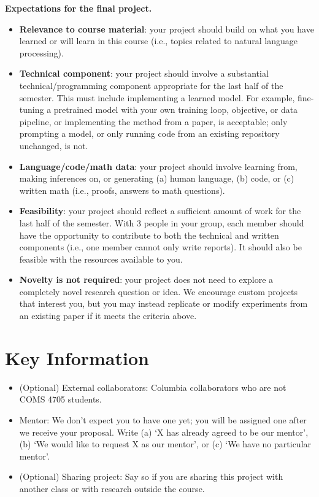 \documentclass{article}
\newcommand{\note}[1]{#1}
\begin{document}
\begin{instructions}
\textbf{Expectations for the final project.}
\begin{itemize}
    \item \textbf{Relevance to course material}: your project should build on what you have learned or will learn in this course (i.e., topics related to natural language processing).
    \item \textbf{Technical component}: your project should involve a substantial technical/programming component appropriate for the last half of the semester. This must include implementing a learned model. For example, fine-tuning a pretrained model with your own training loop, objective, or data pipeline, or implementing the method from a paper, is acceptable; only prompting a model, or only running code from an existing repository unchanged, is not.
    \item \textbf{Language/code/math data}: your project should involve learning from, making inferences on, or generating (a) human language, (b) code, or (c) written math (i.e., proofs, answers to math questions).
    \item \textbf{Feasibility}: your project should reflect a sufficient amount of work for the last half of the semester. With 3 people in your group, each member should have the opportunity to contribute to both the technical and written components (i.e., one member cannot only write reports). It should also be feasible with the resources available to you.
    \item \textbf{Novelty is not required}: your project does not need to explore a completely novel research question or idea. We encourage custom projects that interest you, but you may instead replicate or modify experiments from an existing paper if it meets the criteria above.
\end{itemize}
\end{instructions}

\section{Key Information}

\begin{itemize}
    \item (Optional) External collaborators: \note{Columbia collaborators who are not COMS 4705 students.}
    \item Mentor: \note{We don't expect you to have one yet; you will be assigned one after we receive your proposal. Write (a) `X has already agreed to be our mentor', (b) `We would like to request X as our mentor', or (c) `We have no particular mentor'.}
    \item (Optional) Sharing project: \note{Say so if you are sharing this project with another class or with research outside the course.}
\end{itemize}
\end{document}
